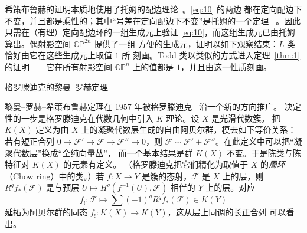 \documentclass[11pt]{amsart}
\makeatletter
\def\subsection{\@startsection{subsection}{2}%
   \z@{1.25\linespacing\@plus.7\linespacing}{.5\linespacing}%
   {\normalfont\bfseries}}
\theoremstyle{definition}
\theoremstyle{remark}
\theoremstyle{plain}
\numberwithin{equation}{section}
\renewcommand{\:}{\colon}
\newcommand{\CP}{{\mathbb C\mathbb P}}
\newcommand{\QQ}{{\mathbb Q}}
\newcommand{\inv}{^{-1}}
\DeclareMathOperator{\Sign}{Sign}
\newcommand{\scrF}{\mathscr{F}}
\makeatother
\begin{document}
\noindent
希策布鲁赫的证明本质地使用了托姆的配边理论~\cite{T1}。\eqref{eq:10} 的两边
都在定向配边下不变，并且都是乘性的；其中“号差在定向配边下不变”是托姆的一个定理
~\cite[\S IV]{T2}。因此只需在（有理）定向配边环的一组生成元上验证
\eqref{eq:10}，而这组生成元已由托姆算出。偶射影空间 $\CP^{2n}$ 提供了一组
方便的生成元，证明以如下观察结束：$L$-类恰好由它在这些生成元上取值 $1$ 所
刻画。Todd 类以类似的方式进入定理~\ref{thm:1} 的证明——它在所有射影空间
$\CP^n$ 上的值都是 $1$，并且由这一性质刻画。


\subsection{格罗滕迪克的黎曼–罗赫定理}\label{subsec:2.2}

黎曼–罗赫–希策布鲁赫定理在 1957 年被格罗滕迪克~\cite{BS} 沿一个新的方向推广。
决定性的一步是格罗滕迪克在代数几何中引入 $K$ 理论。设 $X$ 是光滑代数簇。
把 $K(X)$ 定义为由 $X$ 上的凝聚代数层生成的自由阿贝尔群，模去如下等价关系：
若有短正合列 $0 \to \scrF' \to \scrF \to \scrF'' \to 0$，则
$\scrF \sim \scrF' + \scrF''$。在此定义中可以把“凝聚代数层”换成“全纯向量丛”，
而一个基本结果是群 $K(X)$ 不变。于是陈类与陈特征对 $K(X)$ 的元素有定义。
（格罗滕迪克把它们精化为取值于 $X$ 的{\it 周环}（Chow ring）中的类。）若
$f\:X\to Y$ 是簇的态射，$\scrF$ 是 $X$ 上的层，则 $R^qf_*(\scrF)$ 是与预层
$U\mapsto H^q(f\inv (U),\scrF)$ 相伴的 $Y$ 上的层。对应
  \begin{equation}\label{eq:11}
     f_! \: \scrF\longmapsto \sum (-1)^q R^qf_*(\scrF) \in K(Y)
  \end{equation}
延拓为阿贝尔群的同态 $f_!\: K(X)\longrightarrow K(Y)$，这从层上同调的长正合列
可以看出。


\end{document}
